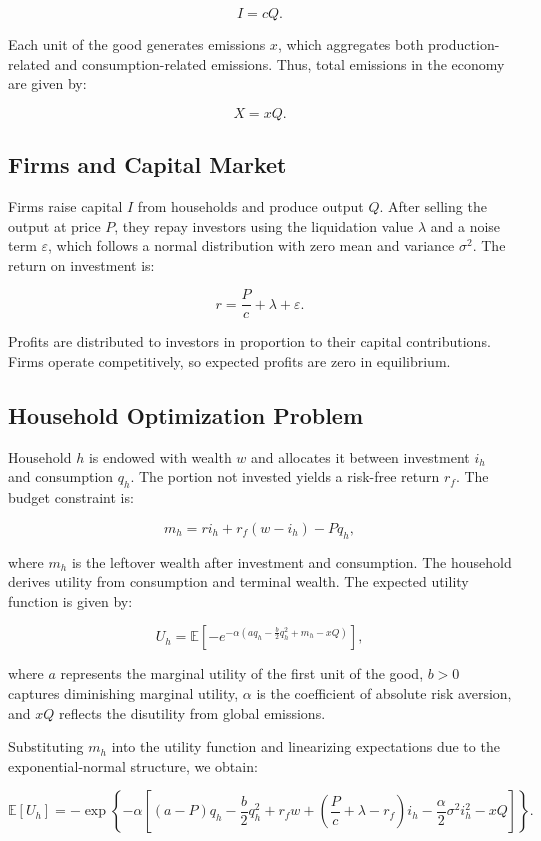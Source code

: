 \documentclass[12pt,a4paper]{article}%
\begin{document}
\[
I = cQ.
\]

Each unit of the good generates emissions $x$, which aggregates both production-related and consumption-related emissions. Thus, total emissions in the economy are given by:

\[
X = xQ.
\]

\subsection*{Firms and Capital Market}

Firms raise capital $I$ from households and produce output $Q$. After selling the output at price $P$, they repay investors using the liquidation value $\lambda$ and a noise term $\varepsilon$, which follows a normal distribution with zero mean and variance $\sigma^2$. The return on investment is:

\[
r = \frac{P}{c} + \lambda + \varepsilon.
\]

Profits are distributed to investors in proportion to their capital contributions. Firms operate competitively, so expected profits are zero in equilibrium.

\subsection*{Household Optimization Problem}

Household $h$ is endowed with wealth $w$ and allocates it between investment $i_h$ and consumption $q_h$. The portion not invested yields a risk-free return $r_f$. The budget constraint is:

\[
m_h = r i_h + r_f(w - i_h) - P q_h,
\]

where $m_h$ is the leftover wealth after investment and consumption. The household derives utility from consumption and terminal wealth. The expected utility function is given by:

\[
U_h = \mathbb{E} \left[ -e^{-\alpha \left( a q_h - \frac{b}{2}q_h^2 + m_h - xQ \right)} \right],
\]

where $a$ represents the marginal utility of the first unit of the good, $b > 0$ captures diminishing marginal utility, $\alpha$ is the coefficient of absolute risk aversion, and $xQ$ reflects the disutility from global emissions.

Substituting $m_h$ into the utility function and linearizing expectations due to the exponential-normal structure, we obtain:

\[
\mathbb{E}[U_h] = -\exp \left\{ -\alpha \left[ (a - P)q_h - \frac{b}{2}q_h^2 + r_f w + \left( \frac{P}{c} + \lambda - r_f \right)i_h - \frac{\alpha}{2} \sigma^2 i_h^2 - xQ \right] \right\}.
\]
\end{document}
